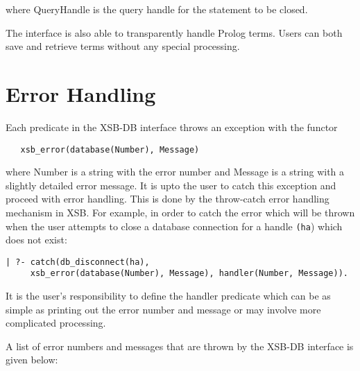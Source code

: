 \noindent
where QueryHandle is the query handle for the statement to be closed.

The interface is also able to transparently handle Prolog terms. 
Users can both save and retrieve terms without any special processing.


\section{Error Handling}

Each predicate in the XSB-DB interface throws an exception with the functor 
\begin{verbatim}
   xsb_error(database(Number), Message) 
\end{verbatim}
where Number is a string with the 
error number and Message is a string with a slightly detailed error message.
It is upto the user to catch this exception
and proceed with error handling. This is done by the throw-catch error
handling mechanism in XSB. For example, in order to catch the error which
will be thrown when the user attempts to close a database connection for 
a handle {\tt (ha}) which does not exist:

\begin{verbatim}
| ?- catch(db_disconnect(ha),
     xsb_error(database(Number), Message), handler(Number, Message)).
\end{verbatim}

It is the user's responsibility to define the handler predicate which can be as simple
as printing out the error number and message or may involve more 
complicated  processing.

A list of error numbers and messages that are thrown by the XSB-DB interface
is given below:

